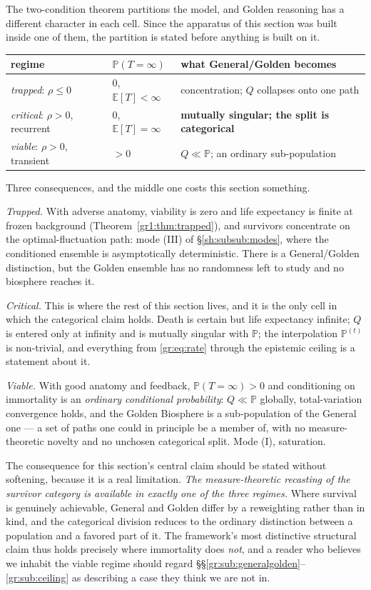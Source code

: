 \documentclass[11pt]{article}
\numberwithin{equation}{section}
\theoremstyle{plain}
\theoremstyle{definition}
\theoremstyle{remark}
\newcommand{\E}{\mathbb{E}}
\newcommand{\PP}{\mathbb{P}}
\begin{document}
The two-condition theorem partitions the model, and Golden reasoning has
a different character in each cell. Since the apparatus of this section
was built inside one of them, the partition is stated before anything is
built on it.

\begin{center}\small
\begin{tabular}{@{}lll@{}}
\toprule
regime & $\PP(T=\infty)$ & what General/Golden becomes\\
\midrule
\emph{trapped}: $\rho\le0$ & $0$, $\E[T]<\infty$ &
concentration; $Q$ collapses onto one path\\
\emph{critical}: $\rho>0$, recurrent & $0$, $\E[T]=\infty$ &
\textbf{mutually singular; the split is categorical}\\
\emph{viable}: $\rho>0$, transient & $>0$ &
$Q\ll\PP$; an ordinary sub-population\\
\bottomrule
\end{tabular}
\end{center}

Three consequences, and the middle one costs this section something.

\emph{Trapped.} With adverse anatomy, viability is zero and life
expectancy is finite at frozen background
(Theorem~\ref{gr1:thm:trapped}), and survivors concentrate on the
optimal-fluctuation path: mode (III) of \S\ref{sh:subsub:modes}, where
the conditioned ensemble is asymptotically deterministic. There is a
General/Golden distinction, but the Golden ensemble has no randomness
left to study and no biosphere reaches it.

\emph{Critical.} This is where the rest of this section lives, and it is
the only cell in which the categorical claim holds. Death is certain but
life expectancy infinite; $Q$ is entered only at infinity and is
mutually singular with $\PP$; the interpolation $\PP^{(t)}$ is
non-trivial, and everything from \eqref{gr:eq:rate} through the
epistemic ceiling is a statement about it.

\emph{Viable.} With good anatomy and feedback, $\PP(T=\infty)>0$ and
conditioning on immortality is an \emph{ordinary conditional
probability}: $Q\ll\PP$ globally, total-variation convergence holds, and
the Golden Biosphere is a sub-population of the General one --- a set of
paths one could in principle be a member of, with no measure-theoretic
novelty and no unchosen categorical split. Mode (I), saturation.

The consequence for this section's central claim should be stated
without softening, because it is a real limitation. \emph{The
measure-theoretic recasting of the survivor category is available in
exactly one of the three regimes.} Where survival is genuinely
achievable, General and Golden differ by a reweighting rather than in
kind, and the categorical division reduces to the ordinary distinction
between a population and a favored part of it. The framework's most
distinctive structural claim thus holds precisely where immortality does
\emph{not}, and a reader who believes we inhabit the viable regime
should regard \S\S\ref{gr:sub:generalgolden}--\ref{gr:sub:ceiling} as
describing a case they think we are not in.
\end{document}
